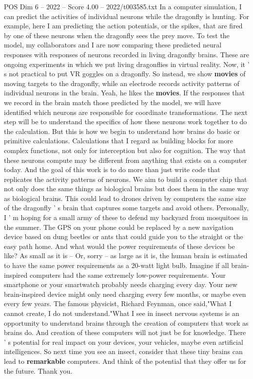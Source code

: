 \begin{textsample}{POS Dim 6 – 2022 – Score 4.00 – 2022/t003585.txt}
In a computer simulation, I can predict the activities of individual neurons while the dragonfly is hunting.
For example, here I am predicting the action potentials, or the spikes, that are fired by one of these neurons when the dragonfly sees the prey move.
To test the model, my collaborators and I are now comparing these predicted neural responses with responses of neurons recorded in living dragonfly brains.
These are ongoing experiments in which we put living dragonflies in virtual reality.
Now, it ' s not practical to put VR goggles on a dragonfly.
So instead, we show \textbf{movies} of moving targets to the dragonfly, while an electrode records activity patterns of individual neurons in the brain.
Yeah, he likes the \textbf{movies}.
If the responses that we record in the brain match those predicted by the model, we will have identified which neurons are responsible for coordinate transformations.
The next step will be to understand the specifics of how these neurons work together to do the calculation.
But this is how we begin to understand how brains do basic or primitive calculations.
Calculations that I regard as building blocks for more complex functions, not only for interception but also for cognition.
The way that these neurons compute may be different from anything that exists on a computer today.
And the goal of this work is to do more than just write code that replicates the activity patterns of neurons.
We aim to build a computer chip that not only does the same things as biological brains but does them in the same way as biological brains.
This could lead to drones driven by computers the same size of the dragonfly ' s brain that captures some targets and avoid others.
Personally, I ' m hoping for a small army of these to defend my backyard from mosquitoes in the summer.
The GPS on your phone could be replaced by a new navigation device based on dung beetles or ants that could guide you to the straight or the easy path home.
And what would the power requirements of these devices be like?
As small as it is -- Or, sorry -- as large as it is, the human brain is estimated to have the same power requirements as a 20-watt light bulb.
Imagine if all brain-inspired computers had the same extremely low-power requirements.
Your smartphone or your smartwatch probably needs charging every day.
Your new brain-inspired device might only need charging every few months, or maybe even every few years.
The famous physicist, Richard Feynman, once said,"What I cannot create, I do not understand."What I see in insect nervous systems is an opportunity to understand brains through the creation of computers that work as brains do.
And creation of these computers will not just be for knowledge.
There ' s potential for real impact on your devices, your vehicles, maybe even artificial intelligences.
So next time you see an insect, consider that these tiny brains can lead to \textbf{remarkable} computers.
And think of the potential that they offer us for the future.
Thank you.

\end{textsample}
